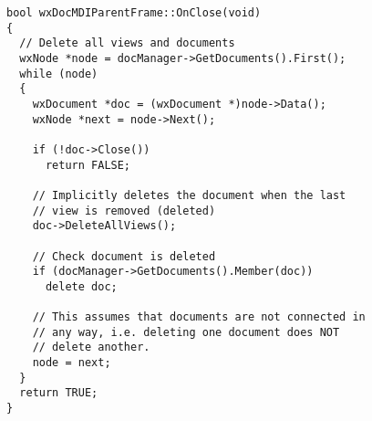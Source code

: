 \begin{verbatim}
bool wxDocMDIParentFrame::OnClose(void)
{
  // Delete all views and documents
  wxNode *node = docManager->GetDocuments().First();
  while (node)
  {
    wxDocument *doc = (wxDocument *)node->Data();
    wxNode *next = node->Next();

    if (!doc->Close())
      return FALSE;

    // Implicitly deletes the document when the last
    // view is removed (deleted)
    doc->DeleteAllViews();

    // Check document is deleted
    if (docManager->GetDocuments().Member(doc))
      delete doc;

    // This assumes that documents are not connected in
    // any way, i.e. deleting one document does NOT
    // delete another.
    node = next;
  }
  return TRUE;
}
\end{verbatim}



